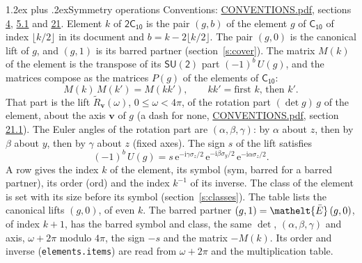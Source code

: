 \documentclass[10pt,a4paper]{article}
\makeatletter
\renewcommand\section{\@startsection{section}{1}{\z@}{-3ex plus -1ex minus -.2ex}%
  {1.2ex plus .2ex}{\normalfont\large\sffamily\bfseries\color{parttitle}}}
\numberwithin{equation}{section}
\newcommand{\eltfont}[1]{{\let\sigma\eltsigma\mathelt{#1}}}
\newcommand{\grp}[1]{\mathsf{#1}}
\newcommand{\elt}[1]{\eltfont{#1}}
\newcommand{\vv}{\mathbf{v}}
\newcommand{\iunit}{\mathrm{i}}
\newcommand{\expe}{\mathrm{e}}
\newcommand{\barred}[1]{\bar{#1}}
\newcommand{\lift}[1]{\tilde{#1}}
\newcommand{\pauli}[1]{\sigma_{#1}}
\makeatother
\begin{document}
\section{Symmetry operations}\label{s:elements}
Conventions: \href{../../CONVENTIONS.pdf}{CONVENTIONS.pdf}, sections \href{../../../rotation/CONVENTIONS.pdf\#conv.4}{4}, \href{../../../rotation/CONVENTIONS.pdf\#conv.5.1}{5.1} and \href{../../CONVENTIONS.pdf\#conv.21}{21}.
\leavevmode\label{n:index.element}\label{n:element.g}Element $k$ of $\grp{2C_{10}}$ is the pair $(g, b)$ of the element $g$ of \href{../../../rotation/data/pdf/C10.pdf}{$\grp{C_{10}}$} of index $\lfloor k/2\rfloor$ in its document and $b = k - 2\lfloor k/2\rfloor$. The pair $(g, 0)$ is the canonical lift of $g$, and $(g, 1)$ is its barred partner (section~\ref{s:cover}). \label{n:matrix.element.pin}\label{n:matrix.element}The matrix $M(k)$ of the element is the transpose of its $\grp{SU(2)}$ part $(-1)^{b}\,U(g)$, and the matrices compose as the matrices $P(g)$ of the elements of $\grp{C_{10}}$:
\begin{equation}\label{e:mprod}M(k)\,M(k') = M(kk'),\qquad kk' = \text{first } k\text{, then } k'.\end{equation}
\leavevmode\label{n:angle.omega}\label{n:vector.axis}\label{n:vector.pole}That part is the lift $\lift{R}_{\vv}(\omega)$, $0 \le \omega < 4\pi$, of the rotation part $(\det g)\,g$ of the element, about the axis $\vv$ of $g$ (a dash for none, \href{../../CONVENTIONS.pdf}{CONVENTIONS.pdf}, section \href{../../CONVENTIONS.pdf\#conv.21.1}{21.1}). \label{n:angle.euler.alpha}\label{n:angle.euler.beta}\label{n:angle.euler.gamma}\label{n:vector.coordinates}The Euler angles of the rotation part are $(\alpha,\beta,\gamma)$: by $\alpha$ about $z$, then by $\beta$ about $y$, then by $\gamma$ about $z$ (fixed axes). \label{n:local.euler.sign}The sign $s$ of the lift satisfies
\begin{equation}\label{e:euler}(-1)^{b}\,U(g) = s\,\expe^{-\iunit\gamma\pauli{z}/2}\,\expe^{-\iunit\beta\pauli{y}/2}\,\expe^{-\iunit\alpha\pauli{z}/2}.\end{equation}
\leavevmode\label{n:index.element.inverse}\label{n:head.sym}\label{n:head.ord}A row gives the index $k$ of the element, its symbol (sym, barred for a barred partner), its order (ord) and the index $k^{-1}$ of its inverse. \label{n:head.class}The class of the element is set with its size before its symbol (section~\ref{s:classes}).
The table lists the canonical lifts $(g, 0)$, of even $k$. The barred partner $(g, 1) = \elt{\barred{E}}\,(g, 0)$, of index $k + 1$, has the barred symbol and class, the same $\det$, $(\alpha,\beta,\gamma)$ and axis, $\omega + 2\pi$ modulo $4\pi$, the sign $-s$ and the matrix $-M(k)$. Its order and inverse (\texttt{elements.items}) are read from $\omega + 2\pi$ and the multiplication table.
\end{document}
